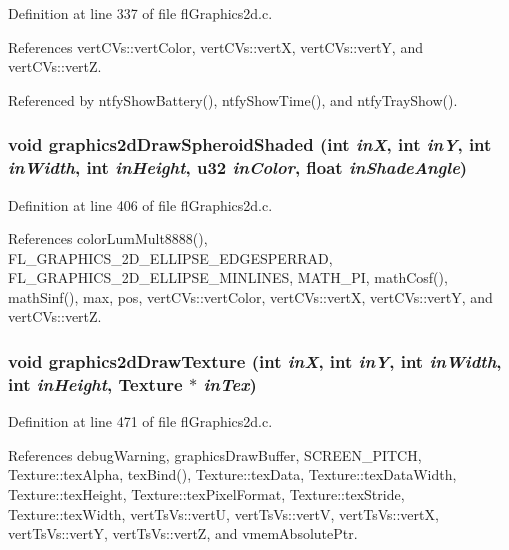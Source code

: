 Definition at line 337 of file fl\-Graphics2d.c.

References vert\-CVs::vert\-Color, vert\-CVs::vert\-X, vert\-CVs::vert\-Y, and vert\-CVs::vert\-Z.

Referenced by ntfy\-Show\-Battery(), ntfy\-Show\-Time(), and ntfy\-Tray\-Show().
\subsubsection{\setlength{\rightskip}{0pt plus 5cm}void graphics2d\-Draw\-Spheroid\-Shaded (int {\em in\-X}, int {\em in\-Y}, int {\em in\-Width}, int {\em in\-Height}, u32 {\em in\-Color}, float {\em in\-Shade\-Angle})}\label{flGraphics2d_8c_f62d364e925524bbd27414944d24c095}




Definition at line 406 of file fl\-Graphics2d.c.

References color\-Lum\-Mult8888(), FL\_\-GRAPHICS\_\-2D\_\-ELLIPSE\_\-EDGESPERRAD, FL\_\-GRAPHICS\_\-2D\_\-ELLIPSE\_\-MINLINES, MATH\_\-PI, math\-Cosf(), math\-Sinf(), max, pos, vert\-CVs::vert\-Color, vert\-CVs::vert\-X, vert\-CVs::vert\-Y, and vert\-CVs::vert\-Z.
\subsubsection{\setlength{\rightskip}{0pt plus 5cm}void graphics2d\-Draw\-Texture (int {\em in\-X}, int {\em in\-Y}, int {\em in\-Width}, int {\em in\-Height}, {\bf Texture} $\ast$ {\em in\-Tex})}\label{flGraphics2d_8c_23111757ed0c0b70bb8131cd0436dd84}




Definition at line 471 of file fl\-Graphics2d.c.

References debug\-Warning, graphics\-Draw\-Buffer, SCREEN\_\-PITCH, Texture::tex\-Alpha, tex\-Bind(), Texture::tex\-Data, Texture::tex\-Data\-Width, Texture::tex\-Height, Texture::tex\-Pixel\-Format, Texture::tex\-Stride, Texture::tex\-Width, vert\-Ts\-Vs::vert\-U, vert\-Ts\-Vs::vert\-V, vert\-Ts\-Vs::vert\-X, vert\-Ts\-Vs::vert\-Y, vert\-Ts\-Vs::vert\-Z, and vmem\-Absolute\-Ptr.
